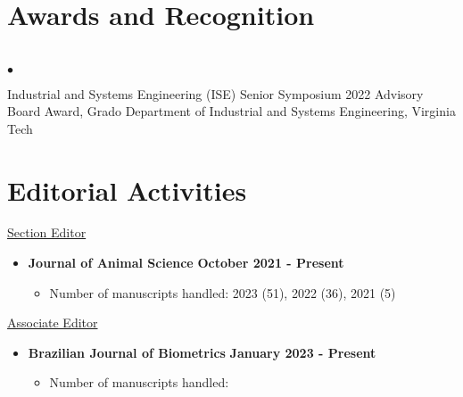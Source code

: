 \documentclass[margin,line,10pt]{res}
\newenvironment{list2}{
  \begin{list}{$\bullet$}{%
      \setlength{\itemsep}{0in}
      \setlength{\parsep}{0in} \setlength{\parskip}{0in}
      \setlength{\topsep}{0in} \setlength{\partopsep}{0in} 
      \setlength{\leftmargin}{0.2in}}}{\end{list}}
\begin{document}
\begin{resume}
\vspace{0.5cm}
\section{\sc Awards and Recognition}
\vspace{1cm}
\section{}
\begin{list2}
  \item Industrial and Systems Engineering (ISE) Senior Symposium 2022 Advisory Board Award, Grado Department of Industrial and Systems Engineering, Virginia Tech 
\end{list2}



\vspace{0.5cm}
\section{\sc Editorial Activities}


\underline{Section Editor}
\vspace{0.2cm}

\begin{itemize}
\item {\bf Journal of Animal Science} \hfill {\bf October 2021 - Present}
  \begin{itemize}
    \item Number of manuscripts handled: 2023 (51), 2022 (36), 2021 (5)
  \end{itemize}
\end{itemize}


\underline{Associate Editor}
\vspace{0.2cm}



\begin{itemize}
  \item {\bf Brazilian Journal of Biometrics} \hfill {\bf January 2023 - Present}
    \begin{itemize}
      \item Number of manuscripts handled: 
    \end{itemize}
  \end{itemize}


\end{resume}
\end{document}
